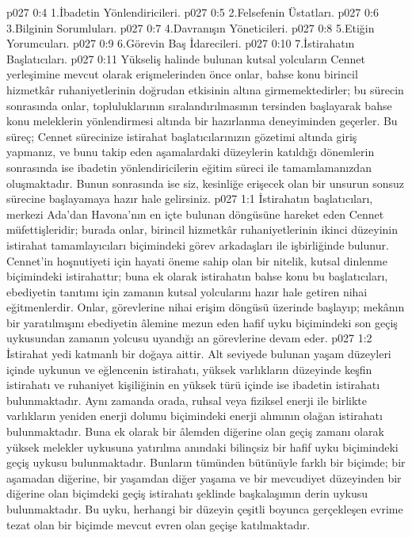 \vs p027 0:4 1.\bibnobreakspace İbadetin Yönlendiricileri.
\vs p027 0:5 2.\bibnobreakspace Felsefenin Üstatları.
\vs p027 0:6 3.\bibnobreakspace Bilginin Sorumluları.
\vs p027 0:7 4.\bibnobreakspace Davranışın Yöneticileri.
\vs p027 0:8 5.\bibnobreakspace Etiğin Yorumcuları.
\vs p027 0:9 6.\bibnobreakspace Görevin Baş İdarecileri.
\vs p027 0:10 7.\bibnobreakspace İstirahatın Başlatıcıları.
\vs p027 0:11 Yükseliş halinde bulunan kutsal yolcuların Cennet yerleşimine mevcut olarak erişmelerinden önce onlar, bahse konu birincil hizmetkâr ruhaniyetlerinin doğrudan etkisinin altına girmemektedirler; bu sürecin sonrasında onlar, topluluklarının sıralandırılmasının tersinden başlayarak bahse konu meleklerin yönlendirmesi altında bir hazırlanma deneyiminden geçerler. Bu süreç; Cennet sürecinize istirahat başlatıcılarınızın gözetimi altında giriş yapmanız, ve bunu takip eden aşamalardaki düzeylerin katıldığı dönemlerin sonrasında ise ibadetin yönlendiricilerin eğitim süreci ile tamamlamanızdan oluşmaktadır. Bunun sonrasında ise siz, kesinliğe erişecek olan bir unsurun sonsuz sürecine başlayamaya hazır hale gelirsiniz.
\vs p027 1:1 İstirahatın başlatıcıları, merkezi Ada’dan Havona’nın en içte bulunan döngüsüne hareket eden Cennet müfettişleridir; burada onlar, birincil hizmetkâr ruhaniyetlerinin ikinci düzeyinin istirahat tamamlayıcıları biçimindeki görev arkadaşları ile işbirliğinde bulunur. Cennet’in hoşnutiyeti için hayati öneme sahip olan bir nitelik, kutsal dinlenme biçimindeki istirahattır; buna ek olarak istirahatın bahse konu bu başlatıcıları, ebediyetin tanıtımı için zamanın kutsal yolcularını hazır hale getiren nihai eğitmenlerdir. Onlar, görevlerine nihai erişim döngüsü üzerinde başlayıp; mekânın bir yaratılmışını ebediyetin âlemine mezun eden hafif uyku biçimindeki son geçiş uykusundan zamanın yolcusu uyandığı an görevlerine devam eder.
\vs p027 1:2 İstirahat yedi katmanlı bir doğaya aittir. Alt seviyede bulunan yaşam düzeyleri içinde uykunun ve eğlencenin istirahatı, yüksek varlıkların düzeyinde keşfin istirahatı ve ruhaniyet kişiliğinin en yüksek türü içinde ise ibadetin istirahatı bulunmaktadır. Aynı zamanda orada, ruhsal veya fiziksel enerji ile birlikte varlıkların yeniden enerji dolumu biçimindeki enerji alımının olağan istirahatı bulunmaktadır. Buna ek olarak bir âlemden diğerine olan geçiş zamanı olarak yüksek melekler uykusuna yatırılma anındaki bilinçsiz bir hafif uyku biçimindeki geçiş uykusu bulunmaktadır. Bunların tümünden bütünüyle farklı bir biçimde; bir aşamadan diğerine, bir yaşamdan diğer yaşama ve bir mevcudiyet düzeyinden bir diğerine olan biçimdeki geçiş istirahatı şeklinde başkalaşımın derin uykusu bulunmaktadır. Bu uyku, herhangi bir düzeyin çeşitli  boyunca gerçekleşen evrime tezat olan bir biçimde mevcut evren  olan geçişe katılmaktadır.
